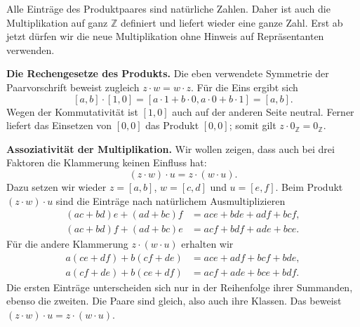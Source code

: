 Alle Einträge des Produktpaares sind natürliche Zahlen. Daher ist
auch die Multiplikation auf ganz \(\mathbb Z\) definiert und
liefert wieder eine ganze Zahl. Erst ab jetzt dürfen wir die neue
Multiplikation ohne Hinweis auf Repräsentanten verwenden.

\medskip\noindent\textbf{Die Rechengesetze des Produkts.}
Die eben verwendete Symmetrie der Paarvorschrift beweist zugleich
\(z\cdot w=w\cdot z\). Für die Eins ergibt sich
\[
  [a,b]\cdot[1,0]=[a\cdot1+b\cdot0,a\cdot0+b\cdot1]=[a,b].
\]
Wegen der Kommutativität ist \([1,0]\) auch auf der anderen Seite
neutral. Ferner liefert das Einsetzen von \([0,0]\) das Produkt
\([0,0]\); somit gilt \(z\cdot0_{\mathbb Z}=0_{\mathbb Z}\).

\medskip\noindent\textbf{Assoziativität der Multiplikation.}
Wir wollen zeigen, dass auch bei drei Faktoren die Klammerung
keinen Einfluss hat:
\[
  (z\cdot w)\cdot u=z\cdot(w\cdot u).
\]
Dazu setzen wir wieder
\(z=[a,b]\), \(w=[c,d]\) und \(u=[e,f]\).
Beim Produkt \((z\cdot w)\cdot u\) sind die Einträge nach
natürlichem Ausmultiplizieren
\[
  \begin{aligned}
    (ac+bd)e+(ad+bc)f&=ace+bde+adf+bcf,\\
    (ac+bd)f+(ad+bc)e&=acf+bdf+ade+bce.
  \end{aligned}
\]
Für die andere Klammerung \(z\cdot(w\cdot u)\) erhalten wir
\[
  \begin{aligned}
    a(ce+df)+b(cf+de)&=ace+adf+bcf+bde,\\
    a(cf+de)+b(ce+df)&=acf+ade+bce+bdf.
  \end{aligned}
\]
Die ersten Einträge unterscheiden sich nur in der Reihenfolge
ihrer Summanden, ebenso die zweiten. Die Paare sind gleich,
also auch ihre Klassen. Das beweist
\((z\cdot w)\cdot u=z\cdot(w\cdot u)\).

